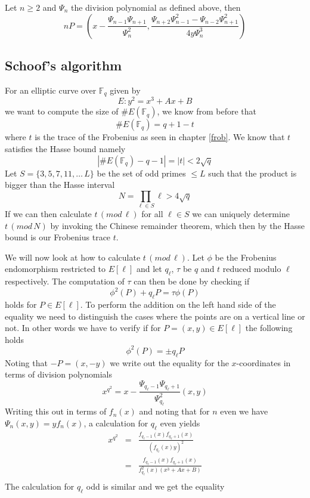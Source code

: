 \begin{prop}
 Let $n \geq 2$ and $\Psi_n$ the division polynomial as defined above, then
$$ nP = (x - \frac{\Psi_{n-1} \Psi_{n+1}}{\Psi_n^2}, \frac{\Psi_{n+2} \Psi_{n-1}^2 - \Psi_{n-2} \Psi_{n+1}^2}{4y \Psi_n^3} )$$
\end{prop}

\subsection{Schoof's algorithm}
For an elliptic curve over $\mathbb{F}_q$ given by
$$ E: y^2 = x^3 + Ax + B $$
we want to compute the size of $\#E(\mathbb{F}_q)$, we know from before that
$$ \#E(\mathbb{F}_q) = q + 1 - t $$
where $t$ is the trace of the Frobenius as seen in chapter \ref{frob}. We know
that $t$ satisfies the Hasse bound namely
$$ |\#E(\mathbb{F}_q)-q-1|=|t| < 2\sqrt{q} $$
Let $S = \{3, 5, 7, 11, \ldots \, L \}$ be the set of odd primes $\leq L$ such
that the product is bigger than the Hasse interval
$$ N = \prod_{\ell \in S} \ell  > 4\sqrt{q} $$
If we can then calculate $t\, (mod\,\ell)$ for all $\ell \in S$ we can uniquely
determine $t\,(mod\,N)$ by invoking the Chinese remainder theorem,
which then by the Hasse bound is our Frobenius trace $t$.

We will now look at
how to calculate $t\, (mod\,\ell)$. Let $\phi$ be the Frobenius endomorphism
restricted to $E[\ell]$ and let $q_\ell$, $\tau$ be $q$ and $t$ reduced modulo $\ell$
respectively. The computation of $\tau$ can then be done by checking if
$$ \phi^2(P) + q_\ell P = \tau \phi(P) $$
holds for $P \in E[\ell]$. To perform the addition on the left hand side of the
equality we need to distinguish the cases where the points are on a vertical line or not.
In other words we have to verify if for $P = (x,y) \in E[\ell]$ the following holds
$$ \phi^2 (P) = \pm q_\ell P $$
Noting that $-P = (x, -y)$ we write out the equality for the $x$-coordinates in terms of
division polynomials
$$ x^{q^2} = x - \frac{\Psi_{q_\ell-1} \Psi_{q_\ell+1}}{\Psi_{q_\ell}^2}(x,y) $$
Writing this out in terms of $f_n(x)$ and noting that for $n$ even we have
$\Psi_n(x,y) = y f_n(x)$, a calculation for $q_\ell$ even yields
\begin{eqnarray*}
 x^{q^2} &=& \frac{f_{q_\ell-1}(x) f_{q_\ell+1}(x)}{(f_{q_\ell}(x) y)^2} \nonumber \\
	 &=& \frac{f_{q_\ell-1}(x) f_{q_\ell+1}(x)}{f_{q_\ell}^2(x) (x^3+Ax+B)} \nonumber \\
\end{eqnarray*}
The calculation for $q_\ell$ odd is similar and we get the equality

